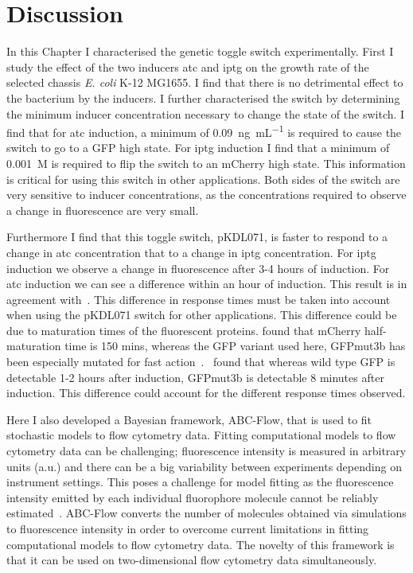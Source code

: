\section{Discussion}

In this Chapter I characterised the genetic toggle switch experimentally. First I study the effect of the two inducers \acrshort{atc} and \acrshort{iptg} on the growth rate of the selected chassis \textit{E. coli} K-12 MG1655. I find that there is no detrimental effect to the bacterium by the inducers. I further characterised the switch by determining the minimum inducer concentration necessary to change the state of the switch. I find that for \acrshort{atc} induction, a minimum of \SI{0.09}{\nano\gram\per\milli\liter} is required to cause the switch to go to a GFP high state. For \acrshort{iptg} induction I find that a minimum of \SI{0.001}{M} is required to flip the switch to an mCherry high state. This information is critical for using this switch in other applications. Both sides of the switch are very sensitive to inducer concentrations, as the concentrations required to observe a change in fluorescence are very small. 


Furthermore I find that this toggle switch, pKDL071, is faster to respond to a change in \acrshort{atc} concentration that to a change in \acrshort{iptg} concentration. For \acrshort{iptg} induction we observe a change in fluorescence after 3-4 hours of induction. For \acrshort{atc} induction we can see a difference within an hour of induction. This result is in agreement with~\textcite{Litcofsky:2012gr}. This difference in response times must be taken into account when using the pKDL071 switch for other applications. This difference could be due to maturation times of the fluorescent proteins. \textcite{Macdonald:2012el} found that mCherry half-maturation time is 150 mins, whereas the GFP variant used here, GFPmut3b has been especially mutated for fast action~\autocite{Cormack:1996gv}.~\textcite{Cormack:1996gv} found that whereas wild type GFP is detectable 1-2 hours after induction, GFPmut3b is detectable 8 minutes after induction. This difference could account for the different response times observed.

Here I also developed a Bayesian framework, ABC-Flow, that is used to fit stochastic models to flow cytometry data. Fitting computational models to flow cytometry data can be challenging; fluorescence intensity is measured in arbitrary units (a.u.) and there can be a big variability between experiments depending on instrument settings. This poses a challenge for model fitting as the fluorescence intensity emitted by each individual fluorophore molecule cannot be reliably estimated~\autocite{Kelwick:2014iy}. ABC-Flow converts the number of molecules obtained via simulations to fluorescence intensity in order to overcome current limitations in fitting computational models to flow cytometry data. The novelty of this framework is that it can be used on two-dimensional flow cytometry data simultaneously. 

